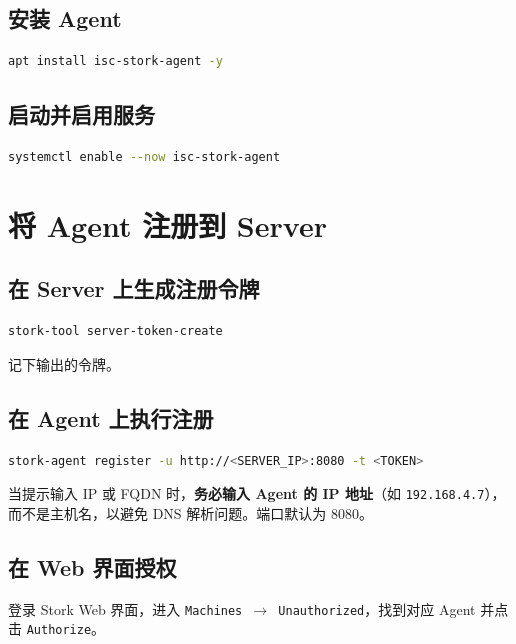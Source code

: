 \documentclass[UTF8, a4paper, 11pt, oneside]{ctexbook}
\begin{document}
\section{安装 Agent}

\begin{lstlisting}[language=bash]
	apt install isc-stork-agent -y
\end{lstlisting}

\section{启动并启用服务}

\begin{lstlisting}[language=bash]
	systemctl enable --now isc-stork-agent
\end{lstlisting}

\chapter{将 Agent 注册到 Server}

\section{在 Server 上生成注册令牌}

\begin{lstlisting}[language=bash]
	stork-tool server-token-create
\end{lstlisting}

记下输出的令牌。

\section{在 Agent 上执行注册}

\begin{lstlisting}[language=bash]
	stork-agent register -u http://<SERVER_IP>:8080 -t <TOKEN>
\end{lstlisting}

当提示输入 IP 或 FQDN 时，\textbf{务必输入 Agent 的 IP 地址}（如 \texttt{192.168.4.7}），而不是主机名，以避免 DNS 解析问题。端口默认为 8080。

\section{在 Web 界面授权}

登录 Stork Web 界面，进入 \texttt{Machines $\rightarrow$ Unauthorized}，找到对应 Agent 并点击 \texttt{Authorize}。
\end{document}

